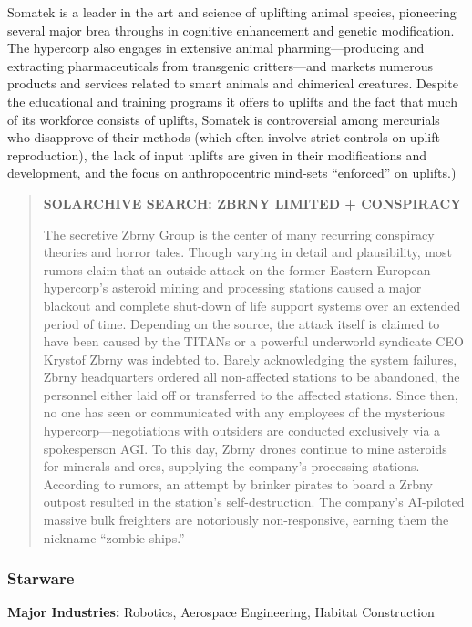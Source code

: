  Somatek is a leader in the art and science of uplifting animal species, pioneering several major brea throughs in cognitive enhancement and genetic modification. The hypercorp also engages in extensive animal pharming—producing and extracting pharmaceuticals from transgenic critters—and markets numerous products and services related to smart animals and chimerical creatures. Despite the educational and training programs it offers to uplifts and the fact that much of its workforce consists of uplifts, Somatek is controversial among mercurials who disapprove of their methods (which often involve strict controls on uplift reproduction), the lack of input uplifts are given in their modifications and development, and the focus on anthropocentric mind-sets “enforced” on uplifts.) 

\begin{quotation}
\textbf{SOLARCHIVE SEARCH: ZBRNY LIMITED + CONSPIRACY} 

 The secretive Zbrny Group is the center of many recurring conspiracy theories and horror tales. Though varying in detail and plausibility, most rumors claim that an outside attack on the former Eastern European hypercorp’s asteroid mining and processing stations caused a major blackout and complete shut-down of life support systems over an extended period of time. Depending on the source, the attack itself is claimed to have been caused by the TITANs or a powerful underworld syndicate CEO Krystof Zbrny was indebted to. Barely acknowledging the system failures, Zbrny headquarters ordered all non-affected stations to be abandoned, the personnel either laid off or transferred to the affected stations. Since then, no one has seen or communicated with any employees of the mysterious hypercorp—negotiations with outsiders are conducted exclusively via a spokesperson AGI. To this day, Zbrny drones continue to mine asteroids for minerals and ores, supplying the company’s processing stations. According to rumors, an attempt by brinker pirates to board a Zrbny outpost resulted in the station’s self-destruction. The company’s AI-piloted massive bulk freighters are notoriously non-responsive, earning them the nickname “zombie ships.”
\end{quotation} 

\subsubsection{Starware}
\label{sec:starware} 

\textbf{Major Industries:} Robotics, Aerospace Engineering, Habitat Construction 


